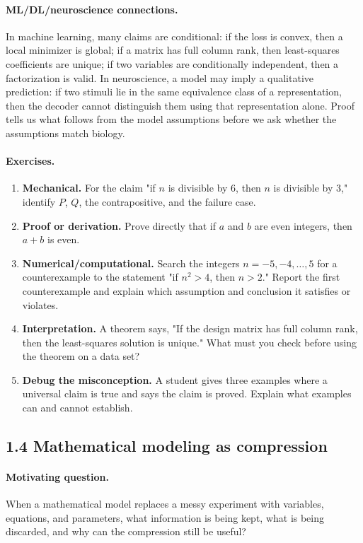 \paragraph{ML/DL/neuroscience connections.}
In machine learning, many claims are conditional: if the loss is convex, then a local minimizer is global; if a matrix has full column rank, then least-squares coefficients are unique; if two variables are conditionally independent, then a factorization is valid. In neuroscience, a model may imply a qualitative prediction: if two stimuli lie in the same equivalence class of a representation, then the decoder cannot distinguish them using that representation alone. Proof tells us what follows from the model assumptions before we ask whether the assumptions match biology.

\paragraph{Exercises.}
\begin{enumerate}[label=\textbf{1.3.\arabic*.}, leftmargin=*]
\item \textbf{Mechanical.} For the claim "if \(n\) is divisible by \(6\), then \(n\) is divisible by \(3\)," identify \(P\), \(Q\), the contrapositive, and the failure case.
\item \textbf{Proof or derivation.} Prove directly that if \(a\) and \(b\) are even integers, then \(a+b\) is even.
\item \textbf{Numerical/computational.} Search the integers \(n=-5,-4,\ldots,5\) for a counterexample to the statement "if \(n^2>4\), then \(n>2\)." Report the first counterexample and explain which assumption and conclusion it satisfies or violates.
\item \textbf{Interpretation.} A theorem says, "If the design matrix has full column rank, then the least-squares solution is unique." What must you check before using the theorem on a data set?
\item \textbf{Debug the misconception.} A student gives three examples where a universal claim is true and says the claim is proved. Explain what examples can and cannot establish.
\end{enumerate}

\subsection{1.4 Mathematical modeling as compression}

\paragraph{Motivating question.}
When a mathematical model replaces a messy experiment with variables, equations, and parameters, what information is being kept, what is being discarded, and why can the compression still be useful?

